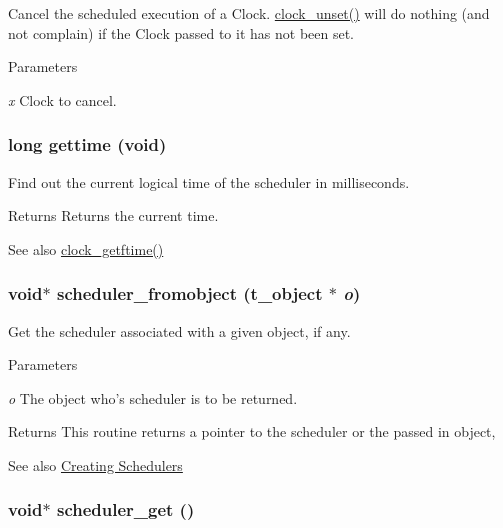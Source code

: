 Cancel the scheduled execution of a Clock. \hyperlink{group__clocks_ga64f5f8a027b39c1c14464744a9cc08ce}{clock\_\-unset()} will do nothing (and not complain) if the Clock passed to it has not been set.


\begin{DoxyParams}{Parameters}
\item[{\em x}]Clock to cancel. \end{DoxyParams}
\hypertarget{group__clocks_gabe5d8b1c9f260d13734a328b2a60ff69}{
\subsubsection[{gettime}]{\setlength{\rightskip}{0pt plus 5cm}long gettime (void)}}
\label{group__clocks_gabe5d8b1c9f260d13734a328b2a60ff69}


Find out the current logical time of the scheduler in milliseconds. \begin{DoxyReturn}{Returns}
Returns the current time. 
\end{DoxyReturn}
\begin{DoxySeeAlso}{See also}
\hyperlink{group__clocks_ga04a49876d29036406f857cf22b99d9ac}{clock\_\-getftime()} 
\end{DoxySeeAlso}
\hypertarget{group__clocks_ga18134769aacb89b12258898166a99ff2}{
\subsubsection[{scheduler\_\-fromobject}]{\setlength{\rightskip}{0pt plus 5cm}void$\ast$ scheduler\_\-fromobject ({\bf t\_\-object} $\ast$ {\em o})}}
\label{group__clocks_ga18134769aacb89b12258898166a99ff2}


Get the scheduler associated with a given object, if any. 
\begin{DoxyParams}{Parameters}
\item[{\em o}]The object who's scheduler is to be returned. \end{DoxyParams}
\begin{DoxyReturn}{Returns}
This routine returns a pointer to the scheduler or the passed in object, 
\end{DoxyReturn}
\begin{DoxySeeAlso}{See also}
\hyperlink{group__clocks_creating_schedulers}{Creating Schedulers} 
\end{DoxySeeAlso}
\hypertarget{group__clocks_ga7f67cd4fe41445e1d11afe84742a6d5f}{
\subsubsection[{scheduler\_\-get}]{\setlength{\rightskip}{0pt plus 5cm}void$\ast$ scheduler\_\-get ()}}
\label{group__clocks_ga7f67cd4fe41445e1d11afe84742a6d5f}


